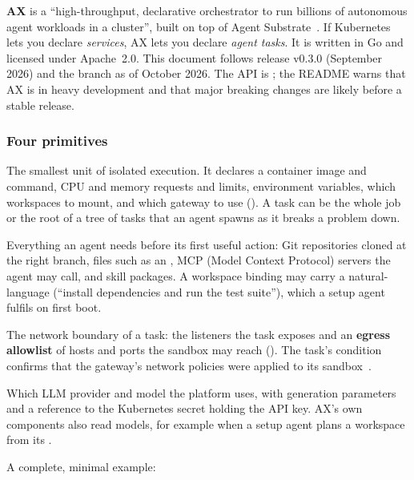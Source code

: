 \textbf{AX} is a ``high-throughput, declarative orchestrator to run billions of autonomous agent workloads in a cluster'', built on top of Agent Substrate~\cite{ax}. If Kubernetes lets you declare \emph{services}, AX lets you declare \emph{agent tasks}. It is written in Go and licensed under Apache~2.0. This document follows release v0.3.0 (September 2026) and the  branch as of October 2026. The API is ; the README warns that AX is in heavy development and that major breaking changes are likely before a stable release.

\subsubsection{Four primitives}\label{sec:ax-primitives}

\begin{description}[leftmargin=0pt,labelindent=0pt,itemsep=0.4em]
  \item[\code{Task}] The smallest unit of isolated execution. It declares a container image and command, CPU and memory requests and limits, environment variables, which workspaces to mount, and which gateway to use (). A task can be the whole job or the root of a tree of tasks that an agent spawns as it breaks a problem down.
  \item[\code{Workspace}] Everything an agent needs before its first useful action: Git repositories cloned at the right branch, files such as an , MCP (Model Context Protocol) servers the agent may call, and skill packages. A workspace binding may carry a natural-language  (``install dependencies and run the test suite''), which a setup agent fulfils on first boot.
  \item[\code{Gateway}] The network boundary of a task: the listeners the task exposes and an \textbf{egress allowlist} of hosts and ports the sandbox may reach (). The task's  condition confirms that the gateway's network policies were applied to its sandbox~\cite{ax-concepts}.
  \item[\code{Model}] Which LLM provider and model the platform uses, with generation parameters and a reference to the Kubernetes secret holding the API key. AX's own components also read models, for example when a setup agent plans a workspace from its .
\end{description}

A complete, minimal example:

